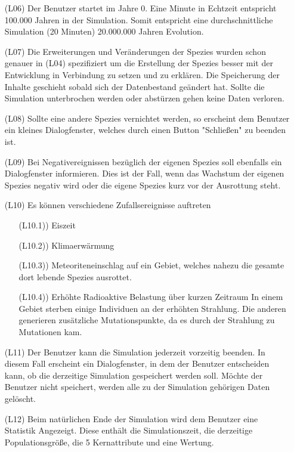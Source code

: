 \documentclass[a4paper, 10pt]{article}
\begin{document}
\begin{enumerate}
\item[(L06)]
Der Benutzer startet im Jahre 0. Eine Minute in Echtzeit entspricht 100.000 Jahren in der Simulation. Somit entspricht eine durchschnittliche Simulation (20 Minuten) 20.000.000 Jahren Evolution.
 
\item[(L07)]
Die Erweiterungen und Veränderungen der Spezies wurden schon genauer in (L04) spezifiziert um die Erstellung der Spezies besser mit der Entwicklung in Verbindung zu setzen und zu erklären. Die Speicherung der Inhalte geschieht sobald sich der Datenbestand geändert hat. Sollte die Simulation unterbrochen werden oder abstürzen gehen keine Daten verloren. 

\item[(L08)]
Sollte eine andere Spezies vernichtet werden, so erscheint dem Benutzer ein kleines Dialogfenster, welches durch einen Button "Schließen" zu beenden ist. 

\item[(L09)]
Bei Negativereignissen bezüglich der eigenen Spezies soll ebenfalls ein Dialogfenster informieren. Dies ist der Fall, wenn das Wachstum der eigenen Spezies negativ wird oder die eigene Spezies kurz vor der Ausrottung steht.


\item[(L10)]
Es können verschiedene Zufallsereignisse auftreten
\begin{enumerate}
\item[(L10.1))]
Eiszeit
\item[(L10.2))]
Klimaerwärmung
\item[(L10.3))]
Meteoriteneinschlag auf ein Gebiet, welches nahezu die gesamte dort lebende Spezies ausrottet. 
\item[(L10.4))]
Erhöhte Radioaktive Belastung über kurzen Zeitraum
In einem Gebiet sterben einige Individuen an der erhöhten Strahlung. Die anderen generieren zusätzliche Mutationspunkte, da es durch der Strahlung zu Mutationen kam.

\end{enumerate}


\item[(L11)]
Der Benutzer kann die Simulation jederzeit vorzeitig beenden. In diesem Fall erscheint ein Dialogfenster, in dem der Benutzer entscheiden kann, ob die derzeitige Simulation gespeichert werden soll. Möchte der Benutzer nicht speichert, werden alle zu der Simulation gehörigen Daten gelöscht.

\item[(L12)]
Beim natürlichen Ende der Simulation wird dem Benutzer eine Statistik Angezeigt. Diese enthält die Simulationszeit, die derzeitige Populationsgröße, die 5 Kernattribute und eine Wertung.

\end{enumerate}
\end{document}

